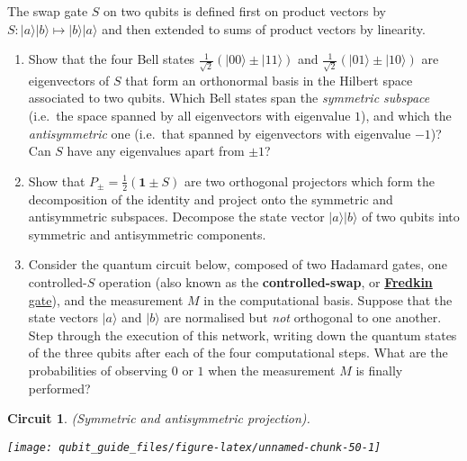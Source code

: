 \documentclass[fleqn]{article}
\newtheorem*{circuit}{Circuit}
\begin{document}
The swap gate \(S\) on two qubits is defined first on product vectors by \(S\colon|a\rangle|b\rangle\mapsto|b\rangle|a\rangle\) and then extended to sums of product vectors by linearity.

\begin{enumerate}
\def\labelenumi{\arabic{enumi}.}
\item
  Show that the four Bell states \(\frac{1}{\sqrt{2}}(|00\rangle\pm|11\rangle)\) and \(\frac{1}{\sqrt{2}}(|01\rangle\pm|10\rangle)\) are eigenvectors of \(S\) that form an orthonormal basis in the Hilbert space associated to two qubits.
  Which Bell states span the \emph{symmetric subspace} (i.e.~the space spanned by all eigenvectors with eigenvalue \(1\)), and which the \emph{antisymmetric} one (i.e.~that spanned by eigenvectors with eigenvalue \(-1\))?
  Can \(S\) have any eigenvalues apart from \(\pm1\)?
\item
  Show that \(P_\pm = \frac{1}{2}(\mathbf{1}\pm S)\) are two orthogonal projectors which form the decomposition of the identity and project onto the symmetric and antisymmetric subspaces.
  Decompose the state vector \(|a\rangle|b\rangle\) of two qubits into symmetric and antisymmetric components.
\item
  Consider the quantum circuit below, composed of two Hadamard gates, one controlled-\(S\) operation (also known as the \textbf{controlled-swap}, or \href{https://en.wikipedia.org/wiki/Fredkin_gate}{\textbf{Fredkin} gate}), and the measurement \(M\) in the computational basis.
  Suppose that the state vectors \(|a\rangle\) and \(|b\rangle\) are normalised but \emph{not} orthogonal to one another.
  Step through the execution of this network, writing down the quantum states of the three qubits after each of the four computational steps.
  What are the probabilities of observing \(0\) or \(1\) when the measurement \(M\) is finally performed?
\end{enumerate}

\begin{circuit}

(Symmetric and antisymmetric projection).

\begin{center}\texttt{[image: qubit\_guide\_files/figure-latex/unnamed-chunk-50-1]} \end{center}

\end{circuit}
\end{document}

